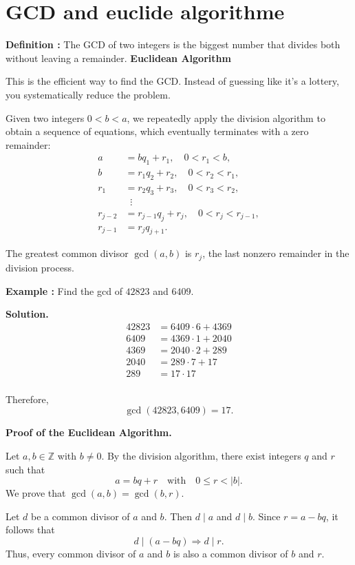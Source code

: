 \section{GCD and euclide algorithme}
\textbf{Definition :}
The GCD of two integers is the biggest number that divides both without leaving a remainder.
\textbf{Euclidean Algorithm}

This is the efficient way to find the GCD. Instead of guessing like it’s a lottery, you systematically reduce the problem.

Given two integers $0 < b < a$, we repeatedly apply the division algorithm to obtain a sequence of equations, which eventually terminates with a zero remainder:
\begin{align*}
a &= bq_1 + r_1, \quad 0 < r_1 < b, \\
b &= r_1 q_2 + r_2, \quad 0 < r_2 < r_1, \\
r_1 &= r_2 q_3 + r_3, \quad 0 < r_3 < r_2, \\
&\;\;\vdots \\
r_{j-2} &= r_{j-1} q_j + r_j, \quad 0 < r_j < r_{j-1}, \\
r_{j-1} &= r_j q_{j+1}.
\end{align*}

The greatest common divisor $\gcd(a,b)$ is $r_j$, the last nonzero remainder in the division process.

\bigskip

\textbf{Example  : } Find the gcd of $42823$ and $6409$.

\textbf{Solution.}
\begin{align*}
42823 &= 6409 \cdot 6 + 4369 \\
6409 &= 4369 \cdot 1 + 2040 \\
4369 &= 2040 \cdot 2 + 289 \\
2040 &= 289 \cdot 7 + 17 \\
289 &= 17 \cdot 17 \\
\end{align*}

Therefore,
\[
\gcd(42823, 6409) = 17.
\]

\textbf{Proof of the Euclidean Algorithm.}

Let $a, b \in \mathbb{Z}$ with $b \neq 0$. By the division algorithm, there exist integers $q$ and $r$ such that
\[
a = bq + r \quad \text{with} \quad 0 \le r < |b|.
\]
We prove that $\gcd(a,b) = \gcd(b,r)$.

Let $d$ be a common divisor of $a$ and $b$. Then $d \mid a$ and $d \mid b$. Since $r = a - bq$, it follows that
\[
d \mid (a - bq) \Rightarrow d \mid r.
\]
Thus, every common divisor of $a$ and $b$ is also a common divisor of $b$ and $r$.

